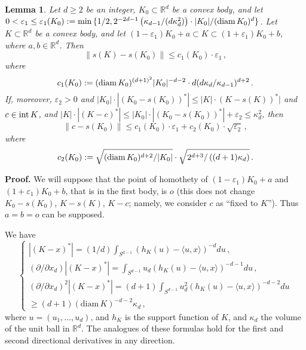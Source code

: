 \documentclass[12pt]{article}
\newtheorem{Lem}[Thm]{Lemma}
\begin{document}

\begin{Lem}
\label{centrestab}
Let $d \ge 2$ be an integer, $K_0 \subset {\mathbb R}^d$ be a convex body, 
and let
$0 < \varepsilon _1 \le \varepsilon _1(K_0):= \min \, \{ 1/2,
2^{-2d-1}
\left( \kappa _{d-1}/(d \kappa _d ^2) \right) \cdot |K_0|
/({\text{\rm{diam}}}\,K_0)^d \}
$. 
Let $K \subset {\mathbb R}^d$ be a convex body, and let 
$(1- \varepsilon _1) K_0 + a 
\subset K \subset (1+ \varepsilon _1)  K_0 +b$, where $a,b \in 
{\mathbb R}^d$. 
Then 
$$
\| s(K)-s(K_0) \| \le c_1(K_0) \cdot \varepsilon _1\,,
$$
where 
$$
c_1(K_0):=
({\text{\rm{diam}}}\,K_0)^{(d+1)^2} 
|K_0|^{-d-2} \cdot d (d \kappa _d / \kappa _{d-1}) ^{d+2} \,.
$$
If, moreover, 
$\varepsilon _2>0$ and $| K_0|
\cdot | \left( K_0-s(K_0) \right) ^*| \le | K|
\cdot \left( K-s(K) \right) ^*|$ and $c \in {\text{\rm{int}}}\,K$, and
$|K| \cdot |(K-c)^*| 
\le |K_0| \cdot
|\left( K_0-s(K_0) \right) ^*| + \varepsilon _2 \le \kappa _d ^2$, 
then 
$$
\|c-s(K_0)\|  \le  c_1(K_0) \cdot \varepsilon _1+ c_2(K_0) \cdot 
\sqrt{ \varepsilon _2 }\,,
$$
where
$$
c_2(K_0):=\sqrt{ ({\text{\rm{diam}}}\,K_0)^{d+2}/| K _0| } \cdot
\sqrt{2^{d+3} / \left( (d+1) \kappa _d \right) }\,.
$$
\end{Lem}


{\bf Proof.}
We will suppose that the point of homothety of $(1- \varepsilon _1) K_0 
+ a$ and $(1+ \varepsilon _1) K_0 +b$, that is in the first body, is
$o$ 
(this does not change $K_0-s(K_0)$, $K-s(K)$, $K-c$; namely, we consider $c$
as ``fixed to $K$'').
Thus $a=b=o$ can be supposed.

We have 
\begin{equation}
\label{derivatives}
\begin{cases}
|(K-x)^*|=(1/d) \int _{S^{d-1}} \left( h_K(u)- \langle u,x \rangle \right)
^{-d} du\,, \\
(\partial / \partial x_d) | (K-x)^* | = \int _{S^{d-1}} u_d \left(
h_K (u) - \langle u,x \rangle \right) ^{-d-1} du\,, \\
(\partial / \partial x_d)^2 | (K-x)^* | = (d+1) \int _{S^{d-1}} u_d^2 \left(
h_K (u) - \langle u,x \rangle \right) ^{-d-2} du \\ 
\ge (d+1) ({\text{diam}}\,K)^{-d-2} \kappa _d\,,
\end{cases}
\end{equation}
where $u=(u_1, \ldots , u_d)$, and  
$h_K$ is the support function of $K$, 
and $\kappa _d$ the volume of the unit ball in
${\mathbb{R}}^d$.
The analogues of these formulas hold for the first and second directional
derivatives in any direction.
\end{document}
